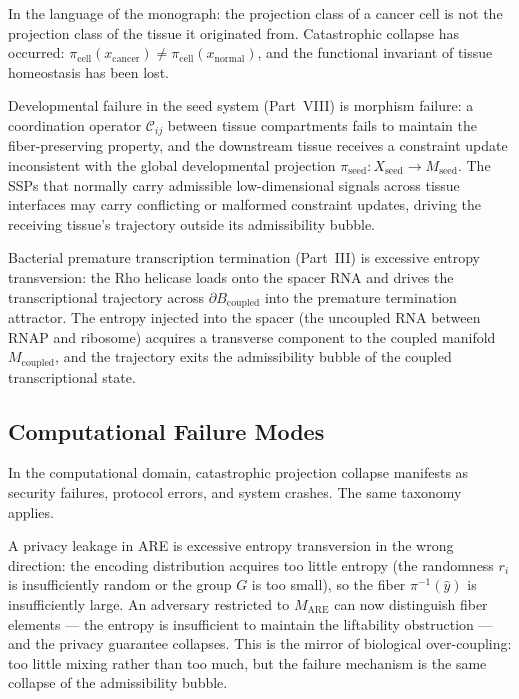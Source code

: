 \documentclass[12pt, a4paper]{article}
\theoremstyle{essaystyle}
\begin{document}
In the language of the monograph: the projection class of a cancer cell is not the
projection class of the tissue it originated from. Catastrophic collapse has occurred:
$\pi_{\mathrm{cell}}(x_{\mathrm{cancer}}) \neq \pi_{\mathrm{cell}}(x_{\mathrm{normal}})$,
and the functional invariant of tissue homeostasis has been lost.

Developmental failure in the seed system (Part~VIII) is morphism failure: a
coordination operator $\mathcal{C}_{ij}$ between tissue compartments fails to
maintain the fiber-preserving property, and the downstream tissue receives a
constraint update inconsistent with the global developmental projection
$\pi_{\mathrm{seed}} : X_{\mathrm{seed}} \to M_{\mathrm{seed}}$. The SSPs that
normally carry admissible low-dimensional signals across tissue interfaces may
carry conflicting or malformed constraint updates, driving the receiving tissue's
trajectory outside its admissibility bubble.

Bacterial premature transcription termination (Part~III) is excessive entropy
transversion: the Rho helicase loads onto the spacer RNA and drives the transcriptional
trajectory across $\partial B_{\mathrm{coupled}}$ into the premature termination
attractor. The entropy injected into the spacer (the uncoupled RNA between RNAP and
ribosome) acquires a transverse component to the coupled manifold
$M_{\mathrm{coupled}}$, and the trajectory exits the admissibility bubble of the
coupled transcriptional state.

\subsection{Computational Failure Modes}

In the computational domain, catastrophic projection collapse manifests as security
failures, protocol errors, and system crashes. The same taxonomy applies.

A privacy leakage in ARE is excessive entropy transversion in the wrong direction:
the encoding distribution acquires too little entropy (the randomness $r_i$ is
insufficiently random or the group $G$ is too small), so the fiber $\pi^{-1}(\hat{y})$
is insufficiently large. An adversary restricted to $M_{\mathrm{ARE}}$ can now
distinguish fiber elements --- the entropy is insufficient to maintain the liftability
obstruction --- and the privacy guarantee collapses. This is the mirror of biological
over-coupling: too little mixing rather than too much, but the failure mechanism is
the same collapse of the admissibility bubble.
\end{document}
